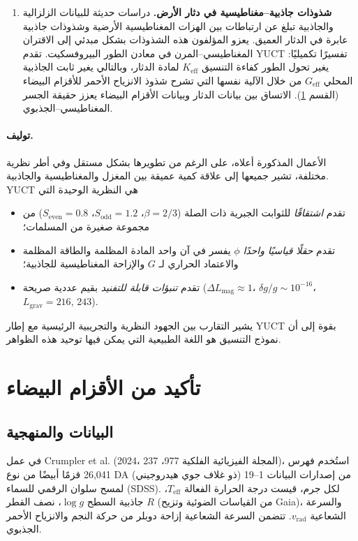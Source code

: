 \documentclass[11pt,a4paper]{article}
\begin{document}
\begin{enumerate}
		\item \textbf{شذوذات جاذبية–مغناطيسية في دثار الأرض.} دراسات حديثة للبيانات الزلزالية والجاذبية \cite{MantleGM2025} تبلغ عن ارتباطات بين الهزات المغناطيسية الأرضية وشذوذات جاذبية عابرة في الدثار العميق. يعزو المؤلفون هذه الشذوذات بشكل مبدئي إلى الاقتران المغناطيسي–المرن في معادن الطور البيروفسكيت. تقدم YUCT تفسيرًا تكميليًا: يغير تحول الطور كفاءة التنسيق $K_{\mathrm{eff}}$ لمادة الدثار، وبالتالي يغير ثابت الجاذبية المحلي $G_{\mathrm{eff}}$ من خلال الآلية نفسها التي تشرح شذوذ الانزياح الأحمر للأقزام البيضاء (القسم \ref{sec:wd}). الاتساق بين بيانات الدثار وبيانات الأقزام البيضاء يعزز حقيقة الجسر المغناطيسي–الجذبوي.
		
	\end{enumerate}
	
	\paragraph{توليف.}
	الأعمال المذكورة أعلاه، على الرغم من تطويرها بشكل مستقل وفي أطر نظرية مختلفة، تشير جميعها إلى علاقة كمية عميقة بين المغزل والمغناطيسية والجاذبية. YUCT هي النظرية الوحيدة التي
	\begin{itemize}
		\item تقدم \emph{اشتقاقًا} للثوابت الجبرية ذات الصلة ($\beta = 2/3$، $S_{\mathrm{odd}} = 1.2$، $S_{\mathrm{even}} = 0.8$) من مجموعة صغيرة من المسلمات؛
		\item تقدم \emph{حقلًا قياسيًا واحدًا} $\phi$ يفسر في آن واحد المادة المظلمة والطاقة المظلمة والاعتماد الحراري لـ $G$ والإزاحة المغناطيسية للجاذبية؛
		\item تقدم \emph{تنبؤات قابلة للتفنيد} بقيم عددية صريحة ($\Delta L_{\mathrm{mag}} \approx 1$، $\delta g/g \sim 10^{-16}$، $L_{\mathrm{grav}} = 216,\,243$).
	\end{itemize}
	يشير التقارب بين الجهود النظرية والتجريبية الرئيسية مع إطار YUCT بقوة إلى أن نموذج التنسيق هو اللغة الطبيعية التي يمكن فيها توحيد هذه الظواهر.
	
	\section{تأكيد من الأقزام البيضاء}
	\label{sec:wd}
	
	\subsection{البيانات والمنهجية}
	\label{subsec:wd-data}
	
	في عمل Crumpler et al. (2024، المجلة الفيزيائية الفلكية 977، 237)، استُخدم فهرس 26,041 قزمًا أبيضًا من نوع DA (ذو غلاف جوي هيدروجيني) من إصدارات البيانات 1–19 لمسح سلوان الرقمي للسماء (SDSS). لكل جرم، قيست درجة الحرارة الفعالة $T_{\text{eff}}$، جاذبية السطح $\log g$، نصف القطر $R$ (من القياسات الضوئية وتزيح Gaia)، والسرعة الشعاعية $v_{\text{rad}}$. تتضمن السرعة الشعاعية إزاحة دوبلر من حركة النجم والانزياح الأحمر الجذبوي.
	
\end{document}
